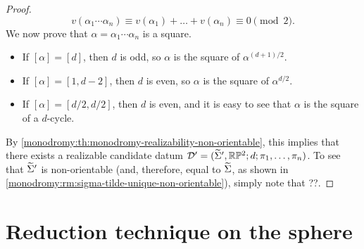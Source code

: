 \begin{proof}
\[
v(\alpha_1\cdots\alpha_n)\equiv v(\alpha_1)+\ldots+v(\alpha_n)\equiv 0\pmod{2}.
\]
We now prove that $\alpha=\alpha_1\cdots\alpha_n$ is a square.
\begin{itemize}
\item If $[\alpha]=[d]$, then $d$ is odd, so $\alpha$ is the square of $\alpha^{(d+1)/2}$.
\item If $[\alpha]=[1,d-2]$, then $d$ is even, so $\alpha$ is the square of $\alpha^{d/2}$.
\item If $[\alpha]=[d/2,d/2]$, then $d$ is even, and it is easy to see that $\alpha$ is the square of a $d$-cycle.
\end{itemize}
By \cref{monodromy:th:monodromy-realizability-non-orientable}, this implies that there exists a realizable candidate datum $\DD'=\datum{\tSigma',\RP[2]}{d}{\pi_1,\ldots,\pi_n}$. To see that $\widetilde{\Sigma}'$ is non-orientable (and, therefore, equal to $\widetilde{\Sigma}$, as shown in \cref{monodromy:rm:sigma-tilde-unique-non-orientable}), simply note that ??.
\end{proof}

\section{Reduction technique on the sphere}


